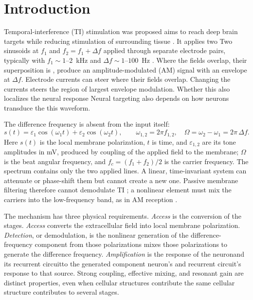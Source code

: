 \documentclass[11pt,a4paper]{article}
\providecommand{\DIFaddtex}[1]{{\protect\color{blue} \sf #1}} %
\providecommand{\DIFdeltex}[1]{{\protect\color{red} \scriptsize #1}} %
\providecommand{\DIFaddbegin}{} %
\providecommand{\DIFaddend}{} %
\providecommand{\DIFdelbegin}{} %
\providecommand{\DIFdelend}{} %
\providecommand{\DIFadd}[1]{\texorpdfstring{\DIFaddtex{#1}}{#1}} %
\providecommand{\DIFdel}[1]{\texorpdfstring{\DIFdeltex{#1}}{}} %
\begin{document}
\section{Introduction}
Temporal-interference (TI) stimulation \DIFdelbegin \DIFdel{was proposed }\DIFdelend \DIFaddbegin \DIFadd{aims }\DIFaddend to reach deep brain targets while
reducing stimulation of surrounding tissue \cite{grossman2017}. \DIFdelbegin \DIFdel{It applies two }\DIFdelend \DIFaddbegin \DIFadd{Two }\DIFaddend sinusoids at
$f_1$ and $f_2=f_1+\Delta f$ \DIFaddbegin \DIFadd{applied }\DIFaddend through separate electrode pairs, typically with
$f_1\sim1$--$2$~kHz and $\Delta f\sim1$--$100$~Hz\DIFdelbegin \DIFdel{. Where the fields overlap, their
superposition is }\DIFdelend \DIFaddbegin \DIFadd{, produce }\DIFaddend an amplitude-modulated
(AM) signal \DIFdelbegin \DIFdel{with an envelope at $\Delta f$. Electrode currents can steer }\DIFdelend \DIFaddbegin \DIFadd{where their fields overlap. Changing the currents steers }\DIFaddend the region
of largest envelope modulation. \DIFdelbegin \DIFdel{Whether this
also localizes the neural response }\DIFdelend \DIFaddbegin \DIFadd{Neural targeting also }\DIFaddend depends on how neurons
transduce \DIFdelbegin \DIFdel{the }\DIFdelend \DIFaddbegin \DIFadd{this }\DIFaddend waveform.

The difference frequency is absent from the input itself:
\begin{equation}
s(t)=\varepsilon_1\cos(\omega_1 t)+\varepsilon_2\cos(\omega_2 t),\qquad
\omega_{1,2}=2\pi f_{1,2},\quad \Omega=\omega_2-\omega_1=2\pi\,\Delta f .
\label{eq:am}
\end{equation}
Here $s(t)$ is the local membrane polarization, $t$ is time, and
$\varepsilon_{1,2}$ are its tone amplitudes in mV, produced by coupling of the applied field to the membrane; $\Omega$ is the beat angular frequency, and
$f_c=(f_1+f_2)/2$ is the carrier frequency. The spectrum contains only the two applied lines. A linear, time-invariant system can attenuate or phase-shift
them but cannot create a new one. Passive membrane filtering therefore cannot
demodulate TI \cite{mirzakhalili2020}; a nonlinear element must mix the carriers into
the low-frequency band, as in AM reception \cite{nahin2001}.

The mechanism has three \DIFdelbegin \DIFdel{physical requirements. \emph{Access} is the conversion of the }\DIFdelend \DIFaddbegin \DIFadd{stages. \emph{Access} converts the }\DIFaddend extracellular field
into local membrane polarization. \emph{Detection}, or demodulation, \DIFdelbegin \DIFdel{is the nonlinear generation of the
difference-frequency component from those
polarizations }\DIFdelend \DIFaddbegin \DIFadd{mixes those
polarizations to generate the difference frequency}\DIFaddend . \emph{Amplification} is the
\DIFdelbegin \DIFdel{response of the neuronand its recurrent circuitto the generated component}\DIFdelend \DIFaddbegin \DIFadd{neuron's and recurrent circuit's response to that source}\DIFaddend . Strong coupling,
effective mixing, and resonant gain are distinct properties, even when \DIFdelbegin \DIFdel{cellular structures contribute }\DIFdelend \DIFaddbegin \DIFadd{the
same cellular structure contributes }\DIFaddend to several stages.
\end{document}
